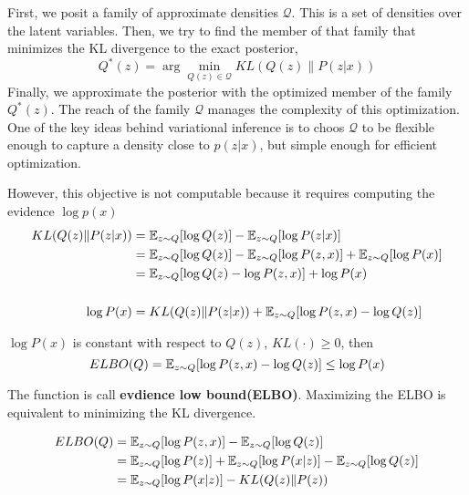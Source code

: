 First, we posit a family of approximate densities $\mathcal{Q}$. This is a set of densities over the latent
variables. Then, we try to find the member of that family that minimizes the KL divergence to the exact posterior,
\begin{equation}
    Q^*(z) = \arg \min_{Q(z) \in \mathcal{Q}} KL(Q(z)\|P(z|x))
\end{equation}
Finally, we approximate the posterior with the optimized member of the family $Q^*(z)$. The reach of the family $\mathcal{Q}$ manages the complexity of this
optimization. One of the key ideas behind variational inference is to choos $\mathcal{Q}$ to be flexible enough to capture a density close to $p(z|x)$, but
simple enough for efficient optimization.

However, this objective is not computable because it requires computing the evidence $\log p(x)$
\begin{equation}
    \begin{split}
        KL(Q(z)\|P(z|x))
        &= \mathbb{E}_{z \sim Q} [\log Q(z)] - \mathbb{E}_{z \sim Q} [\log P(z|x)] \\
        &= \mathbb{E}_{z \sim Q} [\log Q(z)] - \mathbb{E}_{z \sim Q} [\log P(z, x)] + \mathbb{E}_{z \sim Q}[\log P(x)]\\
        &= \mathbb{E}_{z \sim Q} [\log Q(z) - \log P(z, x)] + \log P(x) \\
        \\
        \log P(x)
        &= KL(Q(z)\|P(z|x)) + \mathbb{E}_{z \sim Q} [\log P(z, x) - \log Q(z)]
    \end{split}
\end{equation}

$\log P(x)$ is constant with respect to $Q(z)$, $KL(\cdot ) \ge 0$, then
\begin{equation}
    ELBO(Q) = \mathbb{E}_{z \sim Q} [\log P(z, x) - \log Q(z)] \le \log P(x)
\end{equation}

The function is call \textbf{evdience low bound(ELBO)}. Maximizing the ELBO is equivalent to
minimizing the KL divergence.

\begin{equation}
    \begin{split}
        ELBO(Q)
        &= \mathbb{E}_{z \sim Q} [\log P(z, x)] - \mathbb{E}_{z \sim Q} [\log Q(z)] \\
        &= \mathbb{E}_{z \sim Q} [\log P(z)] + \mathbb{E}_{z \sim Q} [\log P(x|z)] - \mathbb{E}_{z \sim Q} [\log Q(z)] \\
        &= \mathbb{E}_{z \sim Q} [\log P(x|z)] - KL(Q(z)\|P(z))
    \end{split}
\end{equation}

